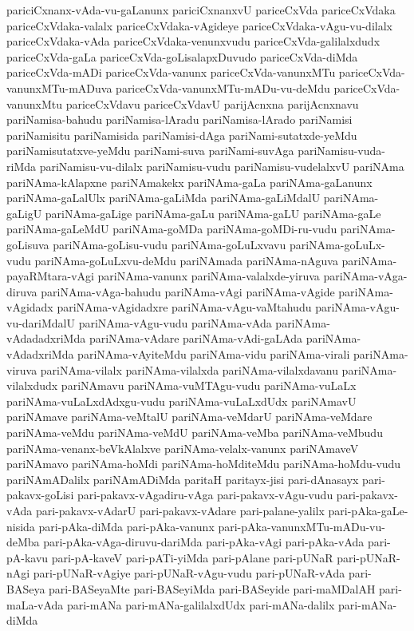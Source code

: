 {pariciCxnanx-vAda-vu-gaLanunx
pariciCxnanxvU
pariceCxVda
pariceCxVdaka
pariceCxVdaka-valalx
pariceCxVdaka-vAgideye
pariceCxVdaka-vAgu-vu-dilalx
pariceCxVdaka-vAda
pariceCxVdaka-venunxvudu
pariceCxVda-galilalxdudx
pariceCxVda-gaLa
pariceCxVda-goLisalapxDuvudo
pariceCxVda-diMda
pariceCxVda-mADi
pariceCxVda-vanunx
pariceCxVda-vanunxMTu
pariceCxVda-vanunxMTu-mADuva
pariceCxVda-vanunxMTu-mADu-vu-deMdu
pariceCxVda-vanunxMtu
pariceCxVdavu
pariceCxVdavU
parijAcnxna
parijAcnxnavu
pariNamisa-bahudu
pariNamisa-lAradu
pariNamisa-lArado
pariNamisi
pariNamisitu
pariNamisida
pariNamisi-dAga
pariNami-sutatxde-yeMdu
pariNamisutatxve-yeMdu
pariNami-suva
pariNami-suvAga
pariNamisu-vuda-riMda
pariNamisu-vu-dilalx
pariNamisu-vudu
pariNamisu-vudelalxvU
pariNAma
pariNAma-kAlapxne
pariNAmakekx
pariNAma-gaLa
pariNAma-gaLanunx
pariNAma-gaLalUlx
pariNAma-gaLiMda
pariNAma-gaLiMdalU
pariNAma-gaLigU
pariNAma-gaLige
pariNAma-gaLu
pariNAma-gaLU
pariNAma-gaLe
pariNAma-gaLeMdU
pariNAma-goMDa
pariNAma-goMDi-ru-vudu
pariNAma-goLisuva
pariNAma-goLisu-vudu
pariNAma-goLuLxvavu
pariNAma-goLuLx-vudu
pariNAma-goLuLxvu-deMdu
pariNAmada
pariNAma-nAguva
pariNAma-payaRMtara-vAgi
pariNAma-vanunx
pariNAma-valalxde-yiruva
pariNAma-vAga-diruva
pariNAma-vAga-bahudu
pariNAma-vAgi
pariNAma-vAgide
pariNAma-vAgidadx
pariNAma-vAgidadxre
pariNAma-vAgu-vaMtahudu
pariNAma-vAgu-vu-dariMdalU
pariNAma-vAgu-vudu
pariNAma-vAda
pariNAma-vAdadadxriMda
pariNAma-vAdare
pariNAma-vAdi-gaLAda
pariNAma-vAdadxriMda
pariNAma-vAyiteMdu
pariNAma-vidu
pariNAma-virali
pariNAma-viruva
pariNAma-vilalx
pariNAma-vilalxda
pariNAma-vilalxdavanu
pariNAma-vilalxdudx
pariNAmavu
pariNAma-vuMTAgu-vudu
pariNAma-vuLaLx
pariNAma-vuLaLxdAdxgu-vudu
pariNAma-vuLaLxdUdx
pariNAmavU
pariNAmave
pariNAma-veMtalU
pariNAma-veMdarU
pariNAma-veMdare
pariNAma-veMdu
pariNAma-veMdU
pariNAma-veMba
pariNAma-veMbudu
pariNAma-venanx-beVkAlalxve
pariNAma-velalx-vanunx
pariNAmaveV
pariNAmavo
pariNAma-hoMdi
pariNAma-hoMditeMdu
pariNAma-hoMdu-vudu
pariNAmADalilx
pariNAmADiMda
paritaH
paritayx-jisi
pari-dAnasayx
pari-pakavx-goLisi
pari-pakavx-vAgadiru-vAga
pari-pakavx-vAgu-vudu
pari-pakavx-vAda
pari-pakavx-vAdarU
pari-pakavx-vAdare
pari-palane-yalilx
pari-pAka-gaLe-nisida
pari-pAka-diMda
pari-pAka-vanunx
pari-pAka-vanunxMTu-mADu-vu-deMba
pari-pAka-vAga-diruvu-dariMda
pari-pAka-vAgi
pari-pAka-vAda
pari-pA-kavu
pari-pA-kaveV
pari-pATi-yiMda
pari-pAlane
pari-pUNaR
pari-pUNaR-nAgi
pari-pUNaR-vAgiye
pari-pUNaR-vAgu-vudu
pari-pUNaR-vAda
pari-BASeya
pari-BASeyaMte
pari-BASeyiMda
pari-BASeyide
pari-maMDalAH
pari-maLa-vAda
pari-mANa
pari-mANa-galilalxdUdx
pari-mANa-dalilx
pari-mANa-diMda
}
